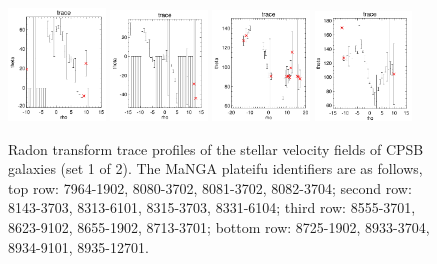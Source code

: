 \documentclass[fleqn,usenatbib]{mnras}
\begin{document}
\begin{figure}
    \includegraphics[width=0.23\textwidth]{Images/trace-plots/trace-plots-cpsbs/8725-1902.png}
    \includegraphics[width=0.23\textwidth]{Images/trace-plots/trace-plots-cpsbs/8933-3704.png}
    \includegraphics[width=0.23\textwidth]{Images/trace-plots/trace-plots-cpsbs/8934-9101.png}
    \includegraphics[width=0.23\textwidth]{Images/trace-plots/trace-plots-cpsbs/8935-12701.png}
    \caption{Radon transform trace profiles of the stellar velocity fields of CPSB galaxies (set 1 of 2). The MaNGA plateifu identifiers are as follows, top row: 7964-1902, 8080-3702, 8081-3702, 8082-3704; second row: 8143-3703, 8313-6101, 8315-3703, 8331-6104; third row: 8555-3701, 8623-9102, 8655-1902, 8713-3701; bottom row: 8725-1902, 8933-3704, 8934-9101, 8935-12701.}
    \label{fig:Radon-traces-CPSBs-1}
\end{figure}
\end{document}
